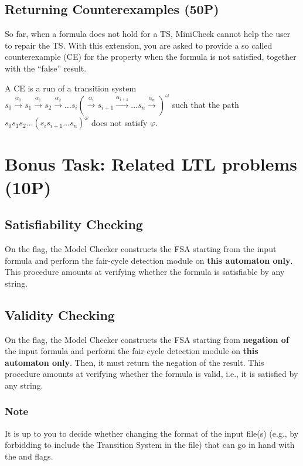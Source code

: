 \subsection{Returning Counterexamples (50P)}
So far, when a formula does not hold for a TS, MiniCheck cannot help the user to repair the TS. With 
this extension, you are asked to provide a so called counterexample (CE) for the property when the formula is not 
satisfied, together with the ``false'' result.

A CE is a run of a transition system $s_0 \xrightarrow[]{\alpha_0} s_1 \xrightarrow[]{\alpha_1} s_2 \xrightarrow[]{\alpha_2} \dots s_i (\xrightarrow[]{\alpha_i} s_{i+1} \xrightarrow[]{\alpha_{i+1}} \dots s_n \xrightarrow[]{\alpha_n})^{\omega}$ such 
that the path $s_0s_1s_2 \dots (s_is_{i+1} \dots s_n )^{\omega}$ does not satisfy $\varphi$.



\section{Bonus Task: Related LTL problems (10P)} \label{sec::bonus1}

\subsection{Satisfiability Checking}
On the  flag, the Model Checker constructs the FSA starting from the input formula
and perform the fair-cycle detection module on \textbf{this automaton only}. 
This procedure amounts at verifying whether the formula is satisfiable by any string. 

\subsection{Validity Checking}
On the  flag, the Model Checker constructs the FSA starting from \textbf{negation of} 
the input formula and perform the fair-cycle detection module on \textbf{this automaton only}. 
Then, it must return the negation of the result.
This procedure amounts at verifying whether the formula is valid, i.e., it is satisfied by any string. 

\subsubsection*{Note}
It is up to you to decide whether changing the format of the input file(s)
(e.g., by forbidding to include the Transition System in the file) 
that can go in hand with the  and  flags.

